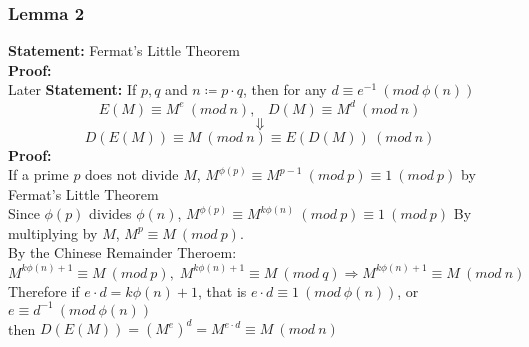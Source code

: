 \documentclass{article}
\begin{document}
\subsubsection{Lemma 2}
\textbf{Statement:} Fermat's Little Theorem \\
\textbf{Proof:}\\
Later
\newpage
\textbf{Statement:} If $p, q$ and $n \coloneqq p \cdot q$, then for any $d \equiv e^{-1} \: (mod \: \phi(n))$
\[ E(M) \equiv M^e \: (mod \: n),\;\;\; D(M) \equiv M^d \: (mod \: n)
\]
\[ \Downarrow \]
\[  D(E(M)) \equiv M \: (mod \: n) \equiv E(D(M)) \: (mod \: n)
\]
\textbf{Proof:} \\
If a prime $p$ does not divide $M$,
$M^ {\phi(p)} \equiv M^ {p-1} \: (mod \: p) \equiv 1 \: (mod \: p)$ by Fermat's Little Theorem \\
Since $\phi(p)$ divides $\phi(n)$, $M^{\phi(p)} \equiv M^{k \phi(n)} \: (mod \: p) \equiv 1 \: (mod \: p)$
By multiplying by $M$, $M^p \equiv M \:(mod \: p)$.
\\ By the Chinese Remainder Theroem: \\
$M^{k \phi(n) + 1} \equiv M \: (mod \: p),\; M^{k \phi(n) + 1} \equiv M \: (mod \: q) \Rightarrow M^{k \phi (n) + 1} \equiv M \: (mod \: n)$\\
Therefore if $e \cdot d = k \phi(n) + 1$, that is $e \cdot d \equiv 1 \: (mod \: \phi(n))$, or $e \equiv d^{-1} \: (mod \: \phi(n))$ \\
then $D(E(M)) = (M^{e})^{d} = M^{e \cdot d} \equiv M \: (mod \: n)$
\newpage
\end{document}
